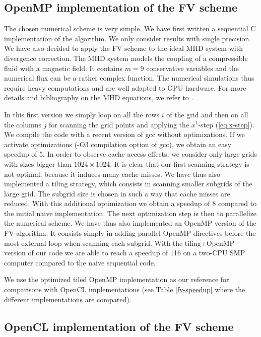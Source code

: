 \documentclass[preprint]{sig-alternate}
\begin{document}
\subsection{OpenMP implementation of the FV scheme}
The chosen numerical scheme is very simple. We have first written a sequential C implementation of the algorithm. We only consider results with single precision. We have also decided to apply the FV scheme to the ideal MHD system with divergence correction. The MHD system models the coupling of a compressible fluid with a magnetic field. It contains $m=9$ conservative variables and the numerical flux can be a rather complex function. The numerical simulations thus require heavy computations and are well adapted to GPU hardware. For more details and bibliography on the MHD equations, we refer to \cite{massaro2014numerical}.

In this first version we simply loop on all the rows $i$ of the grid and then on all the columns $j$ for scanning the grid points and applying the $x^1$-step (\ref{eq:x-step}).
We compile the code with a recent version of gcc without optimizations.
If we activate optimizations (-O3 compilation option of gcc), we obtain an easy speedup of 5. In order to observe cache access effects, we consider only large grids with sizes bigger than $1024\times 1024$.
It is clear that our first scanning strategy is not optimal, because it induces many cache misses. We have thus also implemented a tiling strategy, which consists in scanning smaller subgrids of the large grid. The subgrid size is chosen in such a way that cache misses are reduced. With this additional optimization we obtain a speedup of 8 compared to the initial naive implementation.
The next optimization step is then to parallelize the numerical scheme. We have thus also implemented an OpenMP version of the FV algorithm. It consists simply in adding parallel OpenMP directives before the most external loop when scanning each subgrid. With the tiling+OpenMP version of our code we are able to reach a speedup of 116 
 on a two-CPU SMP computer compared to the naive sequential code.

We use the optimized tiled OpenMP implementation as our reference for comparisons with OpenCL implementations (see Table \ref{fv-speedup} where the different implementations are compared).

\subsection{OpenCL implementation of the FV scheme}
\end{document}
